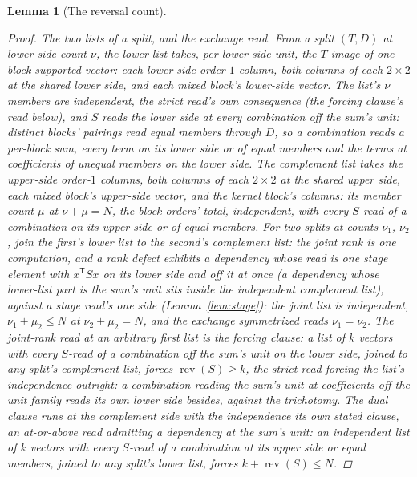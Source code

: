 \documentclass[11pt]{article}
\newtheorem{lemma}{Lemma}
\theoremstyle{definition}
\begin{document}
\begin{lemma}[The reversal count]
\begin{proof}
\emph{The two lists of a split, and the exchange read.} From a split
$(T,D)$ at lower-side count $\nu$, the \emph{lower list} takes, per
lower-side unit, the $T$-image of one block-supported vector: each
lower-side order-$1$ column, both columns of each $2\times2$ at the
shared lower side, and each mixed block's lower-side vector. The list's
$\nu$ members are independent, the strict read's own consequence
(the forcing clause's read below), and $S$ reads the lower side at every
combination off the sum's unit:
distinct blocks' pairings read equal members through $D$, so a combination reads a
per-block sum, every term on its lower side or of equal members and
the terms at coefficients of unequal members on the lower side. The \emph{complement list} takes the
upper-side order-$1$ columns, both columns of each $2\times2$ at the
shared upper side, each mixed block's upper-side vector, and the kernel
block's columns: its member count $\mu$ at $\nu+\mu=N$, the block
orders' total, independent, with every $S$-read of a combination
on its upper side or of
equal members. For two
splits at counts $\nu_1$, $\nu_2$, join the first's lower list to
the second's complement list: the joint rank is one computation, and
a rank defect exhibits a dependency whose read is one stage element
with $x^{\mathsf T}Sx$ on its lower side and off it at once (a
dependency whose lower-list part is the sum's unit sits inside the
independent complement list), against a stage read's one side
(Lemma~\ref{lem:stage}): the joint list is independent,
$\nu_1+\mu_2\le N$ at $\nu_2+\mu_2=N$, and the exchange symmetrized reads
$\nu_1=\nu_2$. The joint-rank read at an arbitrary first list is the
\emph{forcing clause}: a list of $k$ vectors with every
$S$-read of a combination off the sum's unit on the lower side,
joined to any split's complement list,
forces $\operatorname{rev}(S)\ge k$, the strict read forcing the
list's independence outright: a combination reading the sum's unit
at coefficients off the unit family reads its own lower side
besides, against the trichotomy. The \emph{dual clause} runs at
the complement side with the independence its own stated clause,
an at-or-above read admitting a dependency at the sum's unit: an
independent list of $k$ vectors with every $S$-read of a
combination at its upper side or equal members, joined to any
split's lower list, forces $k+\operatorname{rev}(S)\le N$.


\end{proof}
\end{lemma}
\end{document}
